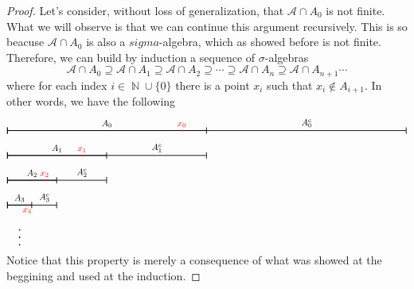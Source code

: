 \documentclass[11pt,twoside,a4paper]{article}
\DeclareMathOperator {\N}{\mathbb{N}}
\theoremstyle{remark}
\theoremstyle{definition}
\theoremstyle{plain}
\begin{document}
\begin{proof}
    Let's consider, without loss of generalization, that $\mathcal{A}\cap A_0$
    is not finite. What we will observe is that we can continue this argument
    recursively. This is so beacuse $\mathcal{A}\cap A_0$ is also a $sigma$-algebra,
    which as showed before is not finite. Therefore, we can build by 
    induction a sequence of $\sigma$-algebras 
    \begin{equation*}
        \mathcal{A} \cap A_0 \supseteq \mathcal{A} \cap A_1 \supseteq \mathcal{A} \cap A_2
        \supseteq \cdots \supseteq
        \mathcal{A} \cap A_n \supseteq \mathcal{A} \cap A_{n+1} \cdots
    \end{equation*}
    where for each index $i \in \N \cup \{0\}$ there is a point $x_{i}$
    such that  $x_i \notin A_{i+1}$. In other words, we have the following
    \begin{equation*}
        \begin{tikzpicture}[
            every path/.style={thick}
            ]

            \draw[|-|] (0,0) -- (16,0) node[near end, above] {$A_0^c$};
            \draw[|-|] (0,0) -- (8,0) node[midway, above]  {$A_0$};
            \fill[color=red] (7,0) circle (0.03cm) node[above]  {$x_0$};

            \draw[|-|] (0,-1) -- (8,-1) node[near end, above] {$A_1^c$};
            \draw[|-|] (0,-1) -- (4,-1) node[midway, above] {$A_1$};
            \fill[color=red] (3,-1) circle (0.03cm) node[above]  {$x_1$};
                            
            \draw[|-|] (0,-2) -- (4,-2) node[near end, above] {$A_2^c$};
            \draw[|-|] (0,-2) -- (2,-2) node[midway, above] {$A_2$};
            \fill[color=red] (1.5,-2) circle (0.03cm) node[above]  {$x_2$};
                            
            \draw[|-|] (0,-3) -- (2,-3) node[near end, above] {$A_3^c$};
            \draw[|-|] (0,-3) -- (1,-3) node[midway, above] {$A_3$};
            \fill[color=red] (0.8,-3) circle (0.03cm) node[below]  {$x_3$};

            \fill (1/2,-4) circle   (0.03cm);
            \fill (1/2,-4.3) circle (0.03cm);
            \fill (1/2,-4.6) circle (0.03cm);

        \end{tikzpicture}
    \end{equation*}
    Notice that this property is merely a consequence of what was showed at the beggining
    and used at the induction.


\end{proof}
\end{document}
